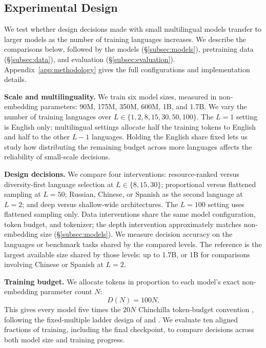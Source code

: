 \providecommand{\citeneeded}[1]{\textcolor{red}{[CITE: #1]}}
\providecommand{\checknum}[1]{\textcolor{orange}{#1}}

\subsection{Experimental Design}
\label{subsec:design}

We test whether design decisions made with small multilingual models transfer to larger models as the number of training languages increases. We describe the comparisons below, followed by the models (\S\ref{subsec:models}), pretraining data (\S\ref{subsec:data}), and evaluation (\S\ref{subsec:evaluation}). Appendix~\ref{app:methodology} gives the full configurations and implementation details.

\textbf{Scale and multilinguality.} We train six model sizes, measured in non-embedding parameters: 90M, 175M, 350M, 600M, 1B, and 1.7B. We vary the number of training languages over $L \in \{1, 2, 8, 15, 30, 50, 100\}$. The $L=1$ setting is English only; multilingual settings allocate half the training tokens to English and half to the other $L-1$ languages. Holding the English share fixed lets us study how distributing the remaining budget across more languages affects the reliability of small-scale decisions.

\textbf{Design decisions.} We compare four interventions: resource-ranked versus diversity-first language selection at $L \in \{8, 15, 30\}$; proportional versus flattened sampling at $L=50$; Russian, Chinese, or Spanish as the second language at $L=2$; and deep versus shallow-wide architectures. The $L=100$ setting uses flattened sampling only. Data interventions share the same model configuration, token budget, and tokenizer; the depth intervention approximately matches non-embedding size (\S\ref{subsec:models}). We measure decision accuracy on the languages or benchmark tasks shared by the compared levels. The reference is the largest available size shared by those levels: up to 1.7B, or 1B for comparisons involving Chinese or Spanish at $L=2$.

\textbf{Training budget.} We allocate tokens in proportion to each model's exact non-embedding parameter count $N$:
\begin{equation}
D(N) = 100N.
\label{eq:training-budget}
\end{equation}
This gives every model five times the $20N$ Chinchilla token-budget convention \citep{hoffmann_training_2022}, following the fixed-multiple ladder design of \citet{bhagia_establishing_2024} and \citet{magnusson_datadecide_2025}. We evaluate ten aligned fractions of training, including the final checkpoint, to compare decisions across both model size and training progress.

